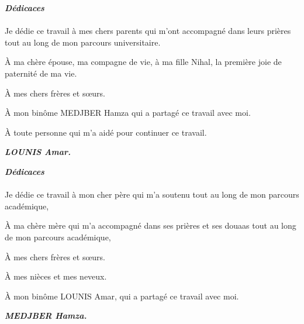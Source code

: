 \begin{center}
\textbf{\Large{\emph{Dédicaces}}}\\
\end{center}
\paragraph{}
\par
Je dédie ce travail à mes chers parents qui m'ont accompagné dans leurs prières tout au long de mon parcours universitaire.
\par
À ma chère épouse, ma compagne de vie, à ma fille Nihal, la première joie de paternité de ma vie.
\par
À mes chers frères et sœurs.
\par
À mon binôme MEDJBER Hamza qui a partagé ce travail avec moi.
\par
À toute personne qui m'a aidé pour continuer ce travail.

\begin{flushright}
\textit{\textbf{LOUNIS Amar.}}
\end{flushright}

\newpage

\begin{center}
\textbf{\Large{\emph{Dédicaces}}}\\
\end{center}
\paragraph{}
\par
Je dédie ce travail  à mon cher père qui m'a soutenu tout au long de mon parcours académique,
\par
À  ma chère mère qui m'a accompagné dans ses prières et ses douaas tout au long de mon parcours académique, 
\par
À mes chers frères et sœurs.
\par
À mes  nièces  et mes neveux.
\par
À mon binôme LOUNIS Amar, qui a partagé ce travail avec moi.
\begin{flushright}
\textit{\textbf{MEDJBER Hamza.}}
\end{flushright}
